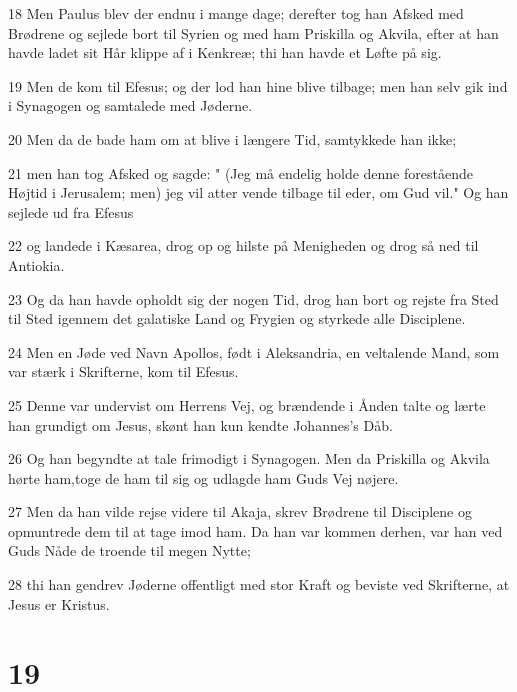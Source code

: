 \par 18 Men Paulus blev der endnu i mange dage; derefter tog han Afsked med Brødrene og sejlede bort til Syrien og med ham Priskilla og Akvila, efter at han havde ladet sit Hår klippe af i Kenkreæ; thi han havde et Løfte på sig.
\par 19 Men de kom til Efesus; og der lod han hine blive tilbage; men han selv gik ind i Synagogen og samtalede med Jøderne.
\par 20 Men da de bade ham om at blive i længere Tid, samtykkede han ikke;
\par 21 men han tog Afsked og sagde: " (Jeg må endelig holde denne forestående Højtid i Jerusalem; men) jeg vil atter vende tilbage til eder, om Gud vil." Og han sejlede ud fra Efesus
\par 22 og landede i Kæsarea, drog op og hilste på Menigheden og drog så ned til Antiokia.
\par 23 Og da han havde opholdt sig der nogen Tid, drog han bort og rejste fra Sted til Sted igennem det galatiske Land og Frygien og styrkede alle Disciplene.
\par 24 Men en Jøde ved Navn Apollos, født i Aleksandria, en veltalende Mand, som var stærk i Skrifterne, kom til Efesus.
\par 25 Denne var undervist om Herrens Vej, og brændende i Ånden talte og lærte han grundigt om Jesus, skønt han kun kendte Johannes's Dåb.
\par 26 Og han begyndte at tale frimodigt i Synagogen. Men da Priskilla og Akvila hørte ham,toge de ham til sig og udlagde ham Guds Vej nøjere.
\par 27 Men da han vilde rejse videre til Akaja, skrev Brødrene til Disciplene og opmuntrede dem til at tage imod ham. Da han var kommen derhen, var han ved Guds Nåde de troende til megen Nytte;
\par 28 thi han gendrev Jøderne offentligt med stor Kraft og beviste ved Skrifterne, at Jesus er Kristus.

\chapter{19}

